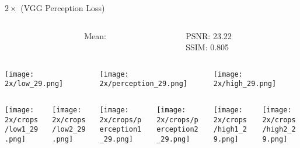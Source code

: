 \documentclass[xcolor={dvipsnames}]{beamer}
\newcommand{\skipbutton}[2]{\hyperlink{#1}{\beamerbutton{#2}}}
\begin{document}
\begin{frame}{\(2\times\) (VGG Perception Loss)}\label{frame:perception_2}
	\begin{columns}
		\begin{column}{0.5\textwidth}
			
		\end{column}
		\begin{column}{0.1\textwidth}
			Mean:\\\phantom{Hallo}
		\end{column}
		\begin{column}{0.4\textwidth}
			PSNR: 23.22 \\
			SSIM: 0.805
		\end{column}
	\end{columns}
	\begin{columns}
		\begin{column}{0.3\linewidth}
			\texttt{[image: 2x/low\_29.png]}
			\begin{columns}
				\begin{column}{0.5\linewidth}
					\texttt{[image: 2x/crops/low1\_29.png]}
				\end{column}
				\begin{column}{0.5\linewidth}
					\texttt{[image: 2x/crops/low2\_29.png]}
				\end{column}
			\end{columns}
		\end{column}
		\begin{column}{0.3\textwidth}
			\texttt{[image: 2x/perception\_29.png]}
			\begin{columns}
				\begin{column}{0.5\linewidth}
					\texttt{[image: 2x/crops/perception1\_29.png]}
				\end{column}
				\begin{column}{0.5\linewidth}
					\texttt{[image: 2x/crops/perception2\_29.png]}
				\end{column}
			\end{columns}
		\end{column}
		\begin{column}{0.3\textwidth}
			\texttt{[image: 2x/high\_29.png]}
			\begin{columns}
				\begin{column}{0.5\linewidth}
					\texttt{[image: 2x/crops/high1\_29.png]}
				\end{column}
				\begin{column}{0.5\linewidth}
					\texttt{[image: 2x/crops/high2\_29.png]}
				\end{column}
			\end{columns}
		\end{column}
	\end{columns}
	
	\hfill
	\skipbutton{frame:psnr}{PSNR}
	\skipbutton{frame:ssim}{SSIM}
\end{frame}
\end{document}
